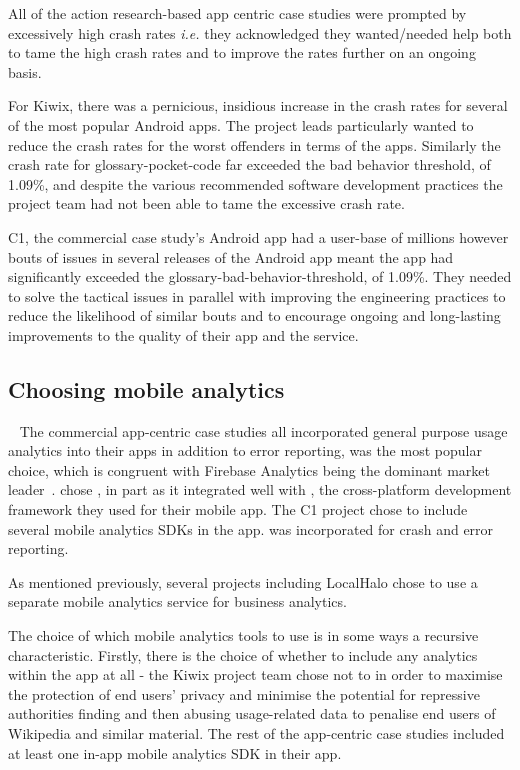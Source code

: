 All of the action research-based app centric case studies were prompted by excessively high crash rates \emph{i.e.} they acknowledged they wanted/needed help both to tame the high crash rates and to improve the rates further on an ongoing basis.

For Kiwix, there was a pernicious, insidious increase in the crash rates for several of the most popular Android apps. The project leads particularly wanted to reduce the crash rates for the worst offenders in terms of the apps. Similarly the crash rate for \gls{glossary-pocket-code} far exceeded the bad behavior threshold, of 1.09\%, and despite the various recommended software development practices the project team had not been able to tame the excessive crash rate.

C1, the commercial case study's Android app had a user-base of millions however bouts of issues in several releases of the Android app meant the app had significantly exceeded the \gls{glossary-bad-behavior-threshold}, of 1.09\%. They needed to solve the tactical issues in parallel with improving the engineering practices to reduce the likelihood of similar bouts and to encourage ongoing and long-lasting improvements to the quality of their app and the service. 

\subsection{Choosing mobile analytics}~\label{aiu-choosing-mobile-analytics-topic}
The commercial app-centric case studies all incorporated general purpose usage analytics into their apps in addition to error reporting,  was the most popular choice, which is congruent with Firebase Analytics being the dominant market leader~.  chose , in part as it integrated well with , the cross-platform development framework they used for their mobile app. The C1 project chose to include several mobile analytics SDKs in the app.  was incorporated for crash and error reporting.

As mentioned previously, several projects including LocalHalo chose to use a separate mobile analytics service for business analytics. 

The choice of which mobile analytics tools to use is in some ways a recursive characteristic. Firstly, there is the choice of whether to include any analytics within the app at all - the Kiwix project team chose not to in order to maximise the protection of end users' privacy and minimise the potential for repressive authorities finding and then abusing usage-related data to penalise end users of Wikipedia and similar material. The rest of the app-centric case studies included at least one in-app mobile analytics SDK in their app.

